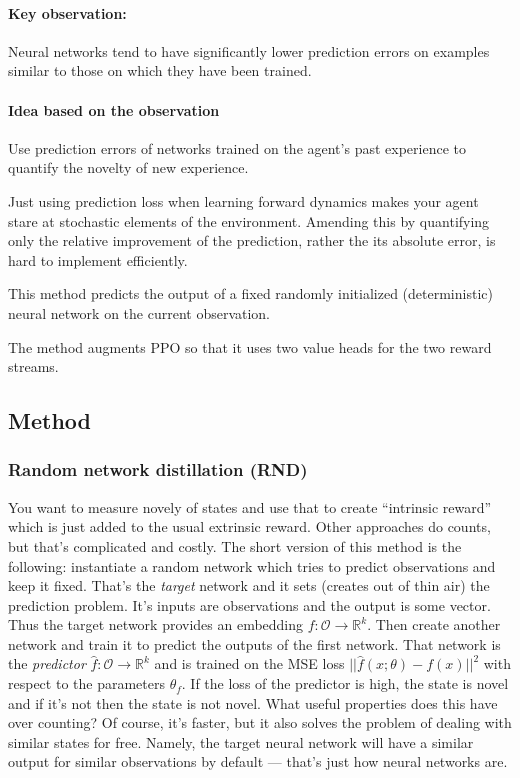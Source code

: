 \documentclass{article}
\begin{document}
\paragraph{Key observation:}
Neural networks tend to have significantly lower prediction errors on examples similar
to those on which they have been trained.
\paragraph{Idea based on the observation}
Use prediction errors of networks trained on the agent's past experience to quantify the novelty of new experience.

Just using prediction loss when learning forward dynamics makes your agent stare at stochastic elements of the environment.
Amending this by quantifying only the relative improvement of the prediction, rather the its absolute error,
is hard to implement efficiently.

This method predicts the output of a fixed randomly initialized (deterministic) neural network on the current observation.

The method augments PPO so that it uses two value heads for the two reward streams.

\subsection{Method}
\subsubsection{Random network distillation (RND)}
You want to measure novely of states and use that to create ``intrinsic reward'' which is just added
to the usual extrinsic reward.
Other approaches do counts, but that's complicated and costly.
The short version of this method is the following:
instantiate a random network which tries to predict observations and keep it fixed.
That's the \textit{target} network and it sets (creates out of thin air) the prediction problem.
It's inputs are observations and the output is some vector.
Thus the target network provides an embedding $f: \mathcal{O} \to \mathbb{R}^k$.
Then create another network and train it to predict the outputs of the first network.
That network is the \textit{predictor} $\hat{f}: \mathcal{O} \to \mathbb{R}^k$
and is trained on the MSE loss $ ||\hat{f}(x;\theta) - f(x)||^2  $ with respect to
the parameters $ \theta_f  $.
If the loss of the predictor is high, the state is novel and if it's not
then the state is not novel.
What useful properties does this have over counting?
Of course, it's faster, but it also solves the problem of dealing with similar states for free.
Namely, the target neural network will have a similar output for similar observations by default ---
that's just how neural networks are.
\end{document}
